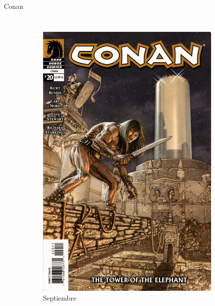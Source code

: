 \begin{frame}{Conan}
	\begin{columns}
		\begin{figure}[htp]
			\centering
			\begin{subfigure}[b]{0.3\textwidth}
				\includegraphics[width=\textwidth]{img/DarkHorse20Portada}
				\caption{Septiembre}
			\end{subfigure}
			~
			\begin{subfigure}[b]{0.3\textwidth}

\end{subfigure}
\end{figure}
\end{columns}
\end{frame}
